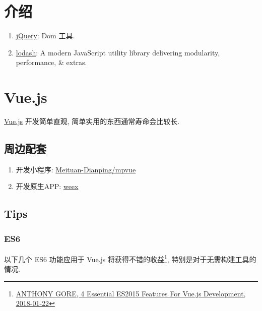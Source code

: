 \section{介绍}\label{ux4ecbux7ecd}

\begin{enumerate}
\def\labelenumi{\arabic{enumi}.}
\tightlist
\item
  \href{https://github.com/jquery/jquery}{jQuery}: Dom 工具.
\item
  \href{https://github.com/lodash/lodash}{lodash}: A modern JavaScript
  utility library delivering modularity, performance, \& extras.
\end{enumerate}

\section{Vue.js}\label{vue.js}

\href{https://github.com/vuejs/vue}{Vue.js} 开发简单直观,
简单实用的东西通常寿命会比较长.

\subsection{周边配套}\label{ux5468ux8fb9ux914dux5957}

\begin{enumerate}
\def\labelenumi{\arabic{enumi}.}
\tightlist
\item
  开发小程序:
  \href{https://github.com/Meituan-Dianping/mpvue}{Meituan-Dianping/mpvue}
\item
  开发原生APP: \href{https://weex.apache.org/}{weex}
\end{enumerate}

\subsection{Tips}\label{tips}

\subsubsection{ES6}\label{es6}

以下几个 ES6 功能应用于 Vue.js 将获得不错的收益\footnote{\href{https://vuejsdevelopers.com/2018/01/22/vue-js-javascript-es6/}{ANTHONY
  GORE, 4 Essential ES2015 Features For Vue.js Development, 2018-01-22}},
特别是对于无需构建工具的情况.

